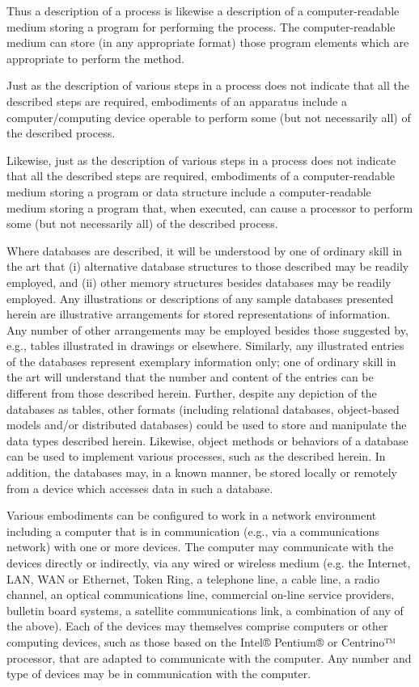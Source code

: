 \documentclass[11pt,a4paper]{article}
\begin{document}
Thus a description of a process is likewise a description of a computer-readable medium storing a program for performing the process. The computer-readable medium can store (in any appropriate format) those program elements which are appropriate to perform the method.

Just as the description of various steps in a process does not indicate that all the described steps are required, embodiments of an apparatus include a computer/computing device operable to perform some (but not necessarily all) of the described process.

Likewise, just as the description of various steps in a process does not indicate that all the described steps are required, embodiments of a computer-readable medium storing a program or data structure include a computer-readable medium storing a program that, when executed, can cause a processor to perform some (but not necessarily all) of the described process.

Where databases are described, it will be understood by one of ordinary skill in the art that (i) alternative database structures to those described may be readily employed, and (ii) other memory structures besides databases may be readily employed. Any illustrations or descriptions of any sample databases presented herein are illustrative arrangements for stored representations of information. Any number of other arrangements may be employed besides those suggested by, e.g., tables illustrated in drawings or elsewhere. Similarly, any illustrated entries of the databases represent exemplary information only; one of ordinary skill in the art will understand that the number and content of the entries can be different from those described herein. Further, despite any depiction of the databases as tables, other formats (including relational databases, object-based models and/or distributed databases) could be used to store and manipulate the data types described herein. Likewise, object methods or behaviors of a database can be used to implement various processes, such as the described herein. In addition, the databases may, in a known manner, be stored locally or remotely from a device which accesses data in such a database.

Various embodiments can be configured to work in a network environment including a computer that is in communication (e.g., via a communications network) with one or more devices. The computer may communicate with the devices directly or indirectly, via any wired or wireless medium (e.g. the Internet, LAN, WAN or Ethernet, Token Ring, a telephone line, a cable line, a radio channel, an optical communications line, commercial on-line service providers, bulletin board systems, a satellite communications link, a combination of any of the above). Each of the devices may themselves comprise computers or other computing devices, such as those based on the Intel® Pentium® or Centrino™ processor, that are adapted to communicate with the computer. Any number and type of devices may be in communication with the computer.
\end{document}

